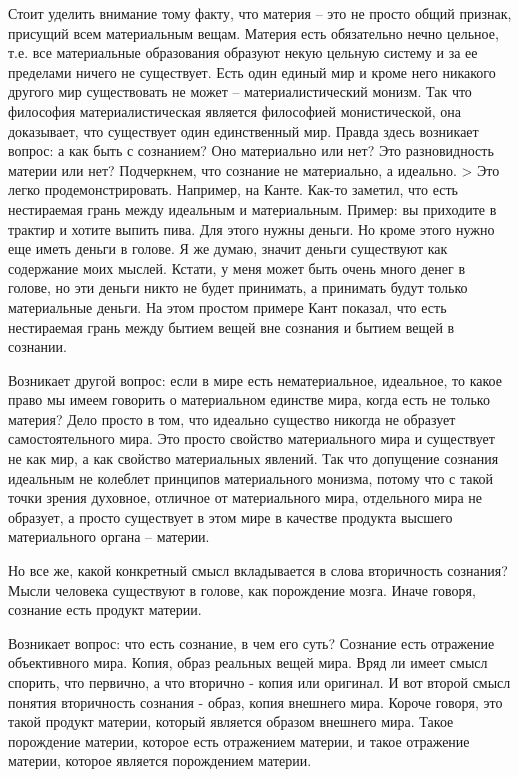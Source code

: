 Стоит уделить внимание тому факту, что материя – это не просто общий признак, присущий всем материальным вещам. Материя есть обязательно нечно цельное, т.е. все материальные образования образуют некую цельную систему и за ее пределами ничего не существует. Есть один единый мир и кроме него никакого другого мир существовать не может – материалистический монизм. Так что философия материалистическая является философией монистической, она доказывает, что существует один единственный мир. Правда здесь возникает вопрос: а как быть с сознанием? Оно материально или нет? Это разновидность материи или нет? Подчеркнем, что сознание не материально, а идеально. > Это легко продемонстрировать. Например, на Канте. Как-то заметил, что есть нестираемая грань между идеальным и материальным. Пример: вы приходите в трактир и хотите выпить пива. Для этого нужны деньги. Но кроме этого нужно еще иметь деньги в голове. Я же думаю, значит деньги существуют как содержание моих мыслей. Кстати, у меня может быть очень много денег в голове, но эти деньги никто не будет принимать, а принимать будут только материальные деньги. На этом простом примере Кант показал, что есть нестираемая грань между бытием вещей вне сознания и бытием вещей в сознании.

Возникает другой вопрос: если в мире есть нематериальное, идеальное, то какое право мы имеем говорить о материальном единстве мира, когда есть не только материя? Дело просто в том, что идеально существо никогда не образует самостоятельного мира. Это просто свойство материального мира и существует не как мир, а как свойство материальных явлений. Так что допущение сознания идеальным не колеблет принципов материального монизма, потому что с такой точки зрения духовное, отличное от материального мира, отдельного мира не образует, а просто существует в этом мире в качестве продукта высшего материального органа – материи.

Но все же, какой конкретный смысл вкладывается в слова вторичность сознания? Мысли человека существуют в голове, как порождение мозга. Иначе говоря, сознание есть продукт материи.

Возникает вопрос: что есть сознание, в чем его суть? Сознание есть отражение объективного мира. Копия, образ реальных вещей мира. Вряд ли имеет смысл спорить, что первично, а что вторично - копия или оригинал. И вот второй смысл понятия вторичность сознания - образ, копия внешнего мира. Короче говоря, это такой продукт материи, который является образом внешнего мира. Такое порождение материи, которое есть отражением материи, и такое отражение материи, которое является порождением материи.


